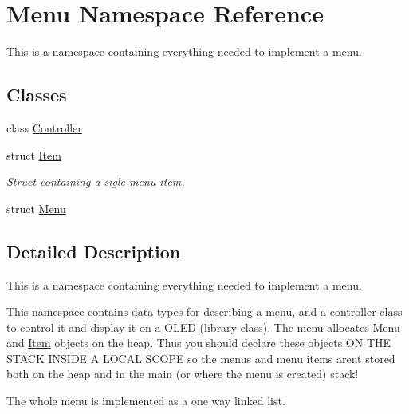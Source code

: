 \hypertarget{namespace_menu}{}\section{Menu Namespace Reference}
\label{namespace_menu}


This is a namespace containing everything needed to implement a menu.  


\subsection*{Classes}
\begin{DoxyCompactItemize}
\item 
class \hyperlink{class_menu_1_1_controller}{Controller}
\item 
struct \hyperlink{struct_menu_1_1_item}{Item}
\begin{DoxyCompactList}\small\item\em Struct containing a sigle menu item. \end{DoxyCompactList}\item 
struct \hyperlink{struct_menu_1_1_menu}{Menu}
\end{DoxyCompactItemize}


\subsection{Detailed Description}
This is a namespace containing everything needed to implement a menu. 

This namespace contains data types for describing a menu, and a controller class to control it and display it on a \hyperlink{class_o_l_e_d}{O\+L\+ED} (library class). The menu allocates \hyperlink{namespace_menu}{Menu} and \hyperlink{struct_menu_1_1_item}{Item} objects on the heap. Thus you should declare these objects ON T\+HE S\+T\+A\+CK I\+N\+S\+I\+DE A L\+O\+C\+AL S\+C\+O\+PE so the menus and menu items aren\textquotesingle{}t stored both on the heap and in the main (or where the menu is created) stack!

The whole menu is implemented as a one way linked list. 